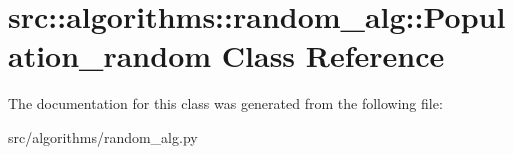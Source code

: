 \hypertarget{classsrc_1_1algorithms_1_1random__alg_1_1Population__random}{
\section{src::algorithms::random\_\-alg::Population\_\-random Class Reference}
\label{classsrc_1_1algorithms_1_1random__alg_1_1Population__random}
}


The documentation for this class was generated from the following file:\begin{DoxyCompactItemize}
\item 
src/algorithms/random\_\-alg.py\end{DoxyCompactItemize}
